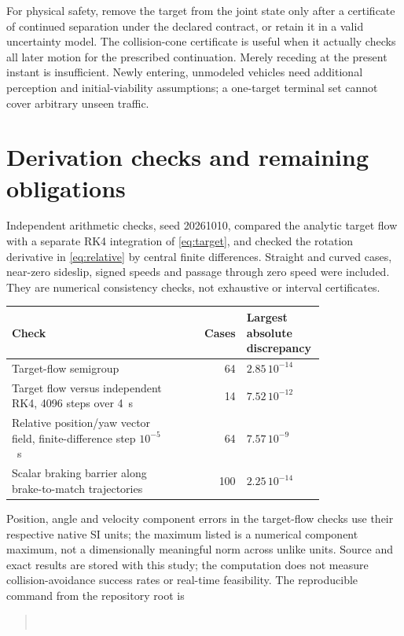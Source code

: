\documentclass[11pt]{article}
\begin{document}
For physical safety, remove the target from the joint state only after a
certificate of continued separation under the declared contract, or retain
it in a valid uncertainty model. The collision-cone certificate is useful
when it actually checks all later motion for the prescribed continuation.
Merely receding at the present instant is insufficient. Newly entering,
unmodeled vehicles need additional perception and initial-viability
assumptions; a one-target terminal set cannot cover arbitrary unseen
traffic.

\section{Derivation checks and remaining obligations}
Independent arithmetic checks, seed 20261010, compared the analytic target
flow with a separate RK4 integration of \eqref{eq:target}, and checked
the rotation derivative in \eqref{eq:relative} by central finite
differences. Straight and curved cases, near-zero sideslip, signed speeds
and passage through zero speed were included. They are numerical
consistency checks, not exhaustive or interval certificates.

\begin{center}
\begin{tabular}{@{}p{0.54\linewidth}rp{0.25\linewidth}@{}}
\toprule
Check & Cases & Largest absolute discrepancy\\
\midrule
Target-flow semigroup & 64 & $2.85\,10^{-14}$\\
Target flow versus independent RK4, 4096 steps over 4~s & 14 & $7.52\,10^{-12}$\\
Relative position/yaw vector field, finite-difference step $10^{-5}$~s & 64 & $7.57\,10^{-9}$\\
Scalar braking barrier along brake-to-match trajectories & 100 & $2.25\,10^{-14}$\\
\bottomrule
\end{tabular}
\end{center}
Position, angle and velocity component errors in the target-flow checks
use their respective native SI units; the maximum listed is a numerical
component maximum, not a dimensionally meaningful norm across unlike units.
Source and exact results are stored with this study; the computation does
not measure collision-avoidance success rates or real-time feasibility.
The reproducible command from the repository root is
\begin{quote}\small
{}\\
\end{quote}
\end{document}
